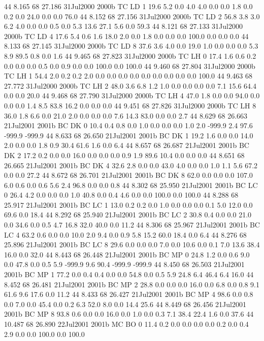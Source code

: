 44 8.165	68 27.186	31Jul2000	2000b	TC	LD	1	19.6	5.2	0.0	4.0	4.0	0.0	0.0	1.8	0.0	0.2	0.0	24.0	0.0	0.0	76.0
44 8.152	68 27.156	31Jul2000	2000b	TC	LD	2	56.8	3.8	3.0	6.2	4.0	0.0	0.0	0.5	0.0	5.3	13.6	27.1	5.6	0.0	59.3
44 8.121	68 27.133	31Jul2000	2000b	TC	LD	4	17.6	5.4	0.6	1.6	18.0	2.0	0.0	1.8	0.0	0.0	0.0	100.0	0.0	0.0	0.0
44 8.133	68 27.145	31Jul2000	2000b	TC	LD	8	37.6	3.6	4.0	0.0	19.0	1.0	0.0	0.0	0.0	5.3	8.9	89.5	0.8	0.0	1.6
44 9.465	68 27.823	31Jul2000	2000b	TC	LH	0	17.4	1.6	0.6	0.2	0.0	0.0	0.0	0.5	0.0	0.9	0.0	0.0	100.0	0.0	100.0
44 9.460	68 27.804	31Jul2000	2000b	TC	LH	1	54.4	2.0	0.2	0.2	2.0	0.0	0.0	0.0	0.0	0.0	0.0	0.0	0.0	0.0	100.0
44 9.463	68 27.772	31Jul2000	2000b	TC	LH	2	48.0	3.6	6.8	1.2	1.0	0.0	0.0	0.0	0.0	7.1	15.6	64.4	0.0	0.0	20.0
44 9.468	68 27.790	31Jul2000	2000b	TC	LH	4	47.0	1.8	0.0	0.0	94.0	0.0	0.0	0.0	1.4	8.5	83.8	16.2	0.0	0.0	0.0
44 9.451	68 27.826	31Jul2000	2000b	TC	LH	8	36.0	1.8	6.6	0.0	21.0	2.0	0.0	0.0	0.0	7.6	14.3	83.0	0.0	0.0	2.7
44 8.629	68 26.663	21Jul2001	2001b	BC	DK	0	10.4	0.4	0.8	0.0	1.0	0.0	0.0	0.0	1.0	2.0	-999.9	2.4	97.6	-999.9	-999.9
44 8.633	68 26.650	21Jul2001	2001b	BC	DK	1	19.2	1.6	0.0	0.0	14.0	2.0	0.0	0.0	1.8	0.9	30.4	61.6	1.6	0.0	6.4
44 8.657	68 26.687	21Jul2001	2001b	BC	DK	2	17.2	0.2	0.0	0.0	16.0	0.0	0.0	0.0	0.9	1.9	89.6	10.4	0.0	0.0	0.0
44 8.651	68 26.665	21Jul2001	2001b	BC	DK	4	32.6	2.8	0.0	0.0	43.0	4.0	0.0	0.0	1.0	1.1	5.6	67.2	0.0	0.0	27.2
44 8.672	68 26.701	21Jul2001	2001b	BC	DK	8	62.0	0.0	0.0	0.0	107.0	6.0	0.6	0.0	0.6	5.6	2.4	96.8	0.0	0.0	0.8
44 8.302	68 25.950	21Jul2001	2001b	BC	LC	0	26.4	4.2	0.0	0.0	0.0	1.0	40.8	0.0	0.4	4.6	0.0	0.0	100.0	0.0	100.0
44 8.288	68 25.917	21Jul2001	2001b	BC	LC	1	13.0	0.2	0.2	0.0	1.0	0.0	0.0	0.0	0.1	5.0	12.0	0.0	69.6	0.0	18.4
44 8.292	68 25.940	21Jul2001	2001b	BC	LC	2	30.8	0.4	0.0	0.0	21.0	0.0	34.6	0.0	0.5	4.7	16.8	32.0	40.0	0.0	11.2
44 8.306	68 25.967	21Jul2001	2001b	BC	LC	4	63.2	0.6	0.0	0.0	10.0	2.0	9.4	0.0	0.9	5.8	15.2	60.0	18.4	0.0	6.4
44 8.276	68 25.896	21Jul2001	2001b	BC	LC	8	29.6	0.0	0.0	0.0	7.0	0.0	10.6	0.0	0.1	7.0	13.6	38.4	16.0	0.0	32.0
44 8.443	68 26.448	21Jul2001	2001b	BC	MP	0	24.8	1.2	0.0	0.6	9.0	0.0	47.8	0.0	0.5	5.9	-999.9	9.6	90.4	-999.9	-999.9
44 8.450	68 26.503	21Jul2001	2001b	BC	MP	1	77.2	0.0	0.4	0.4	0.0	0.0	54.8	0.0	0.5	5.9	24.8	6.4	46.4	6.4	16.0
44 8.452	68 26.481	21Jul2001	2001b	BC	MP	2	28.8	0.0	0.0	0.0	16.0	0.0	6.8	0.0	0.8	9.1	61.6	9.6	17.6	0.0	11.2
44 8.433	68 26.427	21Jul2001	2001b	BC	MP	4	98.6	0.0	0.8	0.0	7.0	0.0	45.4	0.0	0.2	6.3	52.0	8.0	0.0	14.4	25.6
44 8.449	68 26.456	21Jul2001	2001b	BC	MP	8	93.8	0.6	0.0	0.0	16.0	0.0	1.0	0.0	0.3	7.1	38.4	22.4	1.6	0.0	37.6
44 10.487	68 26.890	22Jul2001	2001b	MC	BO	0	11.4	0.2	0.0	0.0	0.0	0.0	0.2	0.0	0.4	2.9	0.0	0.0	100.0	0.0	100.0

